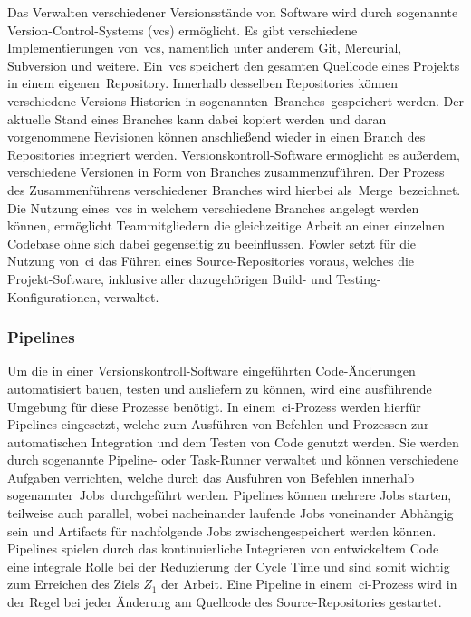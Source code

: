 Das Verwalten verschiedener Versionsstände von Software wird durch sogenannte Version-Control-Systems (\acrshort{vcs})
ermöglicht.
Es gibt verschiedene Implementierungen von\ \acrshort{vcs}, namentlich unter anderem Git, Mercurial, Subversion und
weitere.
Ein\ \acrshort{vcs} speichert den gesamten Quellcode eines Projekts in einem eigenen\ \glqq Repository\grqq.
Innerhalb desselben Repositories können verschiedene Versions-Historien in sogenannten\ \glqq Branches\grqq\ gespeichert
werden.
Der aktuelle Stand eines Branches kann dabei kopiert werden und daran vorgenommene Revisionen können anschließend wieder
in einen Branch des Repositories integriert werden.
Versionskontroll-Software ermöglicht es außerdem, verschiedene Versionen in Form von Branches zusammenzuführen.
Der Prozess des Zusammenführens verschiedener Branches wird hierbei als\ \glqq Merge\grqq\ bezeichnet.
Die Nutzung eines\ \acrshort{vcs} in welchem verschiedene Branches angelegt werden können, ermöglicht Teammitgliedern
die gleichzeitige Arbeit an einer einzelnen Codebase ohne sich dabei gegenseitig zu beeinflussen.
Fowler setzt für die Nutzung von\ \acrshort{ci} das Führen eines Source-Repositories voraus, welches die
Projekt-Software, inklusive aller dazugehörigen Build- und Testing-Konfigurationen, verwaltet.

\subsubsection{Pipelines}

Um die in einer Versionskontroll-Software eingeführten Code-Änderungen automatisiert bauen, testen und ausliefern zu
können, wird eine ausführende Umgebung für diese Prozesse benötigt.
In einem\ \acrshort{ci}-Prozess werden hierfür Pipelines eingesetzt, welche zum Ausführen von Befehlen und Prozessen
zur automatischen Integration und dem Testen von Code genutzt werden.
Sie werden durch sogenannte Pipeline- oder Task-Runner verwaltet und können verschiedene Aufgaben verrichten,
welche durch das Ausführen von Befehlen innerhalb sogenannter\ \glqq Jobs\grqq\ durchgeführt werden.
Pipelines können mehrere Jobs starten, teilweise auch parallel, wobei nacheinander laufende Jobs voneinander
Abhängig sein und Artifacts für nachfolgende Jobs zwischengespeichert werden können.
Pipelines spielen durch das kontinuierliche Integrieren von entwickeltem Code eine integrale Rolle bei der Reduzierung
der Cycle Time und sind somit wichtig zum Erreichen des Ziels $Z_1$ der Arbeit.
Eine Pipeline in einem\ \acrshort{ci}-Prozess wird in der Regel bei jeder Änderung am Quellcode des Source-Repositories
gestartet.

